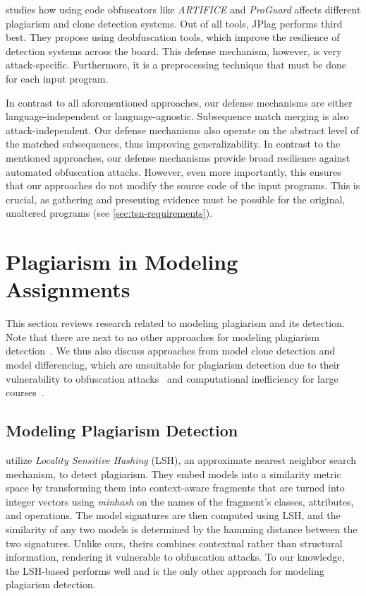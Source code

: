 \citet{cabre2014} studies how using code obfuscators like \textit{ARTIFICE} and \textit{ProGuard} affects different plagiarism and clone detection systems. Out of all tools, JPlag performs third best. They propose using deobfuscation tools, which improve the resilience of detection systems across the board. This defense mechanism, however, is very attack-specific. Furthermore, it is a preprocessing technique that must be done for each input program.

\noindent
In contrast to all aforementioned approaches, our defense mechanisms are either language-independent or language-agnostic. Subsequence match merging is also attack-independent. Our defense mechanisms also operate on the abstract level of the matched subsequences, thus improving generalizability. In contrast to the mentioned approaches, our defense mechanisms provide broad resilience against automated obfuscation attacks.
However, even more importantly, this ensures that our approaches do not modify the source code of the input programs. This is crucial, as gathering and presenting evidence must be possible for the original, unaltered programs (see \autoref{sec:tsn-requirements}).

\section{Plagiarism in Modeling Assignments}

\noindent
This section reviews research related to modeling plagiarism and its detection.
Note that there are next to no other approaches for modeling plagiarism detection~\cite{Martinez2020}.
We thus also discuss approaches from model clone detection and model differencing, which are unsuitable for plagiarism detection due to their vulnerability to obfuscation attacks~\cite{Saglam2022} and computational inefficiency for large courses~\cite{Martinez2020}.

\subsection{Modeling Plagiarism Detection}
\citet{Martinez2020} utilize \emph{Locality Sensitive Hashing} (LSH), an approximate nearest neighbor search mechanism, to detect plagiarism. They embed models into a similarity metric space by transforming them into context-aware fragments that are turned into integer vectors using \textit{minhash} on the names of the fragment's classes, attributes, and operations.
The model signatures are then computed using LSH, and the similarity of any two models is determined by the hamming distance between the two signatures. 
Unlike ours, theirs combines contextual rather than structural information, rendering it vulnerable to obfuscation attacks.
To our knowledge, the LSH-based performs well and is the only other approach for modeling plagiarism detection.

